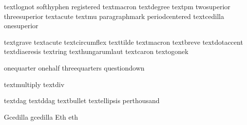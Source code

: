  textlognot     {}
 softhyphen     {}
 registered     {}
 textmacron     {}
 textdegree     {}
 textpm         {}
 twosuperior    {}
 threesuperior  {}
 textacute      {}
 textmu         {}
 paragraphmark  {}
 periodcentered {}
 textcedilla    {}
 onesuperior    {}

 textgrave        {}
 textacute        {}
 textcircumflex   {}
 texttilde        {}
 textmacron       {}
 textbreve        {}
 textdotaccent    {}
 textdiaeresis    {}
 textring         {}
 texthungarumlaut {}
 textcaron        {}
 textogonek       {}

 onequarter       {}
 onehalf          {}
 threequarters    {}
 questiondown     {}

 textmultiply     {}
 textdiv          {}

 textdag          {}
 textddag         {}
 textbullet       {}
 textellipsis     {}
 perthousand      {}

 Gcedilla         {}
 gcedilla         {}
 Eth              {}
 eth              {}


